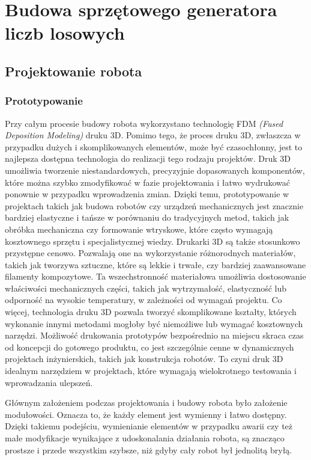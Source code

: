 
\chapter{Budowa sprzętowego generatora liczb losowych}
\section{Projektowanie robota}
\subsection{Prototypowanie}

Przy całym procesie budowy robota wykorzystano technologię FDM \textit{(Fused Deposition Modeling)} druku 3D. Pomimo tego, że proces druku 3D, zwłaszcza w przypadku dużych i skomplikowanych elementów, może być czasochłonny, jest to najlepsza dostępna
technologia do realizacji tego rodzaju projektów. Druk 3D umożliwia tworzenie niestandardowych, precyzyjnie dopasowanych komponentów, które można 
szybko zmodyfikować w fazie projektowania i łatwo wydrukować ponownie w przypadku wprowadzenia zmian. Dzięki temu, prototypowanie w projektach takich 
jak budowa robotów czy urządzeń mechanicznych jest znacznie bardziej elastyczne i tańsze w porównaniu do tradycyjnych metod, takich jak obróbka 
mechaniczna czy formowanie wtryskowe, które często wymagają kosztownego sprzętu i specjalistycznej wiedzy.
Drukarki 3D są także stosunkowo przystępne cenowo. Pozwalają one na wykorzystanie różnorodnych materiałów, takich jak tworzywa sztuczne, które są lekkie 
i trwałe, czy bardziej zaawansowane filamenty kompozytowe. Ta wszechstronność materiałowa umożliwia dostosowanie właściwości mechanicznych części, takich 
jak wytrzymałość, elastyczność lub odporność na wysokie temperatury, w zależności od wymagań projektu.
Co więcej, technologia druku 3D pozwala tworzyć skomplikowane kształty, których wykonanie innymi metodami mogłoby być niemożliwe lub wymagać kosztownych 
narzędzi. Możliwość drukowania prototypów bezpośrednio na miejscu skraca czas od koncepcji do gotowego produktu, co jest szczególnie cenne w dynamicznych 
projektach inżynierskich, takich jak konstrukcja robotów. To czyni druk 3D idealnym narzędziem w projektach, które wymagają wielokrotnego 
testowania i wprowadzania ulepszeń.

Głównym założeniem podczas projektowania i budowy robota było założenie modułowości. Oznacza to, że każdy element jest wymienny i łatwo dostępny.
Dzięki takiemu podejściu, wymienianie elementów w przypadku awarii czy też małe modyfikacje wynikające z udoskonalania działania robota,
są znacząco prostsze i przede wszystkim szybsze, niż gdyby cały robot był jednolitą bryłą.

